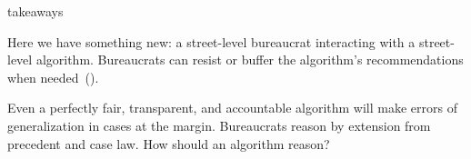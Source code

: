 \documentclass[presentation]{subfiles}
\begin{document}
\begin{frame}
\begin{columns}[t]
\begin{column}{0.32\textwidth}
\begin{flushleft}
  \end{flushleft}
  \end{column}
  \end{columns}


\end{frame}

\begin{frame}{takeaways}
  
\alert{Here we have something new}: a street-level bureaucrat interacting with a street-level algorithm. Bureaucrats can resist or buffer the algorithm’s recommendations when needed~(\cite{doi:10.1177/2053951717718855,Veale:2018:FAD:3173574.3174014}).

Even a perfectly fair, transparent, and accountable algorithm will make errors of generalization in cases at the margin. Bureaucrats reason by extension from precedent and case law. How should an algorithm reason?


\end{frame}
\end{document}
